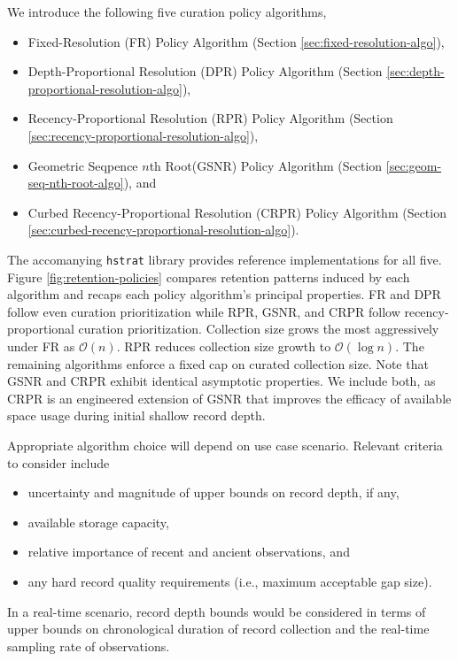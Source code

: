 We introduce the following five curation policy algorithms,
\begin{itemize}
\item Fixed-Resolution (FR) Policy Algorithm (Section \ref{sec:fixed-resolution-algo}),
\item Depth-Proportional Resolution (DPR) Policy Algorithm (Section \ref{sec:depth-proportional-resolution-algo}),
\item Recency-Proportional Resolution (RPR) Policy Algorithm (Section \ref{sec:recency-proportional-resolution-algo}),
\item Geometric Seqpence $n$th Root(GSNR) Policy Algorithm (Section \ref{sec:geom-seq-nth-root-algo}), and
\item Curbed Recency-Proportional Resolution (CRPR) Policy Algorithm (Section \ref{sec:curbed-recency-proportional-resolution-algo}).
\end{itemize}
The accomanying \texttt{hstrat} library provides reference implementations for all five.
Figure \ref{fig:retention-policies} compares retention patterns induced by each algorithm and recaps each policy algorithm's principal properties.
FR and DPR follow even curation prioritization while RPR, GSNR, and CRPR follow recency-proportional curation prioritization.
Collection size grows the most aggressively under FR as $\mathcal{O}(n)$.
RPR reduces collection size growth to $\mathcal{O}(\log n)$.
The remaining algorithms enforce a fixed cap on curated collection size.
Note that GSNR and CRPR exhibit identical asymptotic properties.
We include both, as CRPR is an engineered extension of GSNR that improves the efficacy of available space usage during initial shallow record depth.

Appropriate algorithm choice will depend on use case scenario.
Relevant criteria to consider include
\begin{itemize}
  \item uncertainty and magnitude of upper bounds on record depth, if any,
  \item available storage capacity,
  \item relative importance of recent and ancient observations, and
  \item any hard record quality requirements (i.e., maximum acceptable gap size).
\end{itemize}

In a real-time scenario, record depth bounds would be considered in terms of upper bounds on chronological duration of record collection and the real-time sampling rate of observations.










